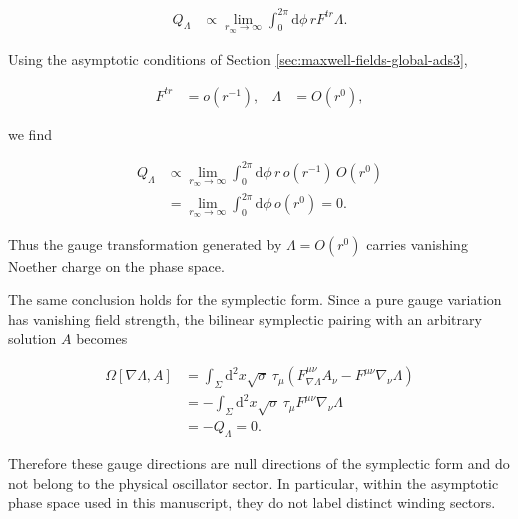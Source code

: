 \begin{align}
Q_{\Lambda}
&\propto \lim_{r_{\infty}\to\infty}\int_{0}^{2\pi}\mathrm{d}\phi\,rF^{tr}\Lambda.
\end{align}

Using the asymptotic conditions of Section \ref{sec:maxwell-fields-global-ads3},

\begin{align}
F^{tr}&=o(r^{-1}), &
\Lambda&=O(r^{0}),
\end{align}

we find

\begin{align}
Q_{\Lambda}
&\propto \lim_{r_{\infty}\to\infty}\int_{0}^{2\pi}\mathrm{d}\phi\,r\,o(r^{-1})\,O(r^{0}) \\
&=\lim_{r_{\infty}\to\infty}\int_{0}^{2\pi}\mathrm{d}\phi\,o(r^{0})=0.
\end{align}

Thus the gauge transformation generated by $\Lambda=O(r^{0})$ carries vanishing Noether charge on the phase space.

The same conclusion holds for the symplectic form. Since a pure gauge variation has vanishing field strength, the bilinear symplectic pairing with an arbitrary solution $A$ becomes

\begin{align}
\Omega[\nabla\Lambda,A]
&=\int_{\Sigma}\mathrm{d}^{2}x\sqrt{\sigma}\,\tau_{\mu}\left(F^{\mu\nu}_{\nabla\Lambda}A_{\nu}-F^{\mu\nu}\nabla_{\nu}\Lambda\right) \\
&=-\int_{\Sigma}\mathrm{d}^{2}x\sqrt{\sigma}\,\tau_{\mu}F^{\mu\nu}\nabla_{\nu}\Lambda \\
&=-Q_{\Lambda}=0.
\end{align}

Therefore these gauge directions are null directions of the symplectic form and do not belong to the physical oscillator sector. In particular, within the asymptotic phase space used in this manuscript, they do not label distinct winding sectors.
